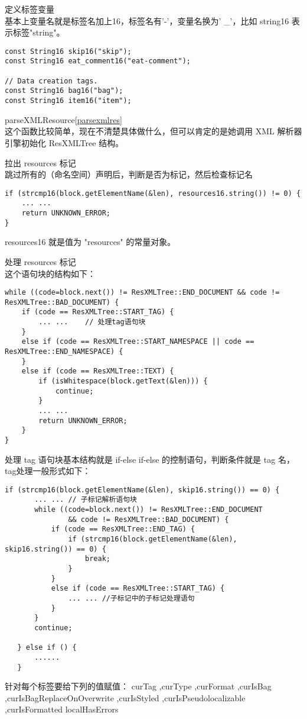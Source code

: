 \documentclass[a4paper,11pt]{article}
\begin{document}
\begin{itemize*}
    \item 定义标签变量\\基本上变量名就是标签名加上16，标签名有'-'，变量名换为'
        _'，比如 string16 表示标签"string"。
\begin{lstlisting}
const String16 skip16("skip");
const String16 eat_comment16("eat-comment");

// Data creation tags.
const String16 bag16("bag");
const String16 item16("item");
\end{lstlisting}
    \item parseXMLResource\cref{parsexmlres}\\
这个函数比较简单，现在不清楚具体做什么，但可以肯定的是她调用 XML
解析器引擎初始化 ResXMLTree 结构。
    \item 拉出 resources 标记\\
跳过所有的（命名空间）声明后，判断是否为标记，然后检查标记名
\begin{lstlisting}
if (strcmp16(block.getElementName(&len), resources16.string()) != 0) {
    ... ...
    return UNKNOWN_ERROR;
}
\end{lstlisting}
resources16 就是值为 "resources" 的常量对象。
\item 处理 resources 标记\\
    这个语句块的结构如下：
\begin{lstlisting}
while ((code=block.next()) != ResXMLTree::END_DOCUMENT && code != ResXMLTree::BAD_DOCUMENT) {
    if (code == ResXMLTree::START_TAG) {
        ... ...    // 处理tag语句块
    }
    else if (code == ResXMLTree::START_NAMESPACE || code == ResXMLTree::END_NAMESPACE) {
    }
    else if (code == ResXMLTree::TEXT) {
        if (isWhitespace(block.getText(&len))) {
            continue;
        }
        ... ...
        return UNKNOWN_ERROR;
    }
}
\end{lstlisting}
\end{itemize*}

处理 tag 语句块基本结构就是 if-else if-else 的控制语句，判断条件就是 tag
名，tag处理一般形式如下：
\begin{lstlisting}
if (strcmp16(block.getElementName(&len), skip16.string()) == 0) {
       ... ... // 子标记解析语句块  
       while ((code=block.next()) != ResXMLTree::END_DOCUMENT
               && code != ResXMLTree::BAD_DOCUMENT) {
           if (code == ResXMLTree::END_TAG) {
               if (strcmp16(block.getElementName(&len), skip16.string()) == 0) {
                   break;
               }
           }
           else if (code == ResXMLTree::START_TAG) {
               ... ... //子标记中的子标记处理语句
           }
       }
       continue;

   } else if () {
       ......
   }
\end{lstlisting}
针对每个标签要给下列的值赋值：
curTag ,curType ,curFormat ,curIsBag ,curIsBagReplaceOnOverwrite ,curIsStyled 
,curIsPseudolocalizable ,curIsFormatted localHasErrors 
\end{document}
